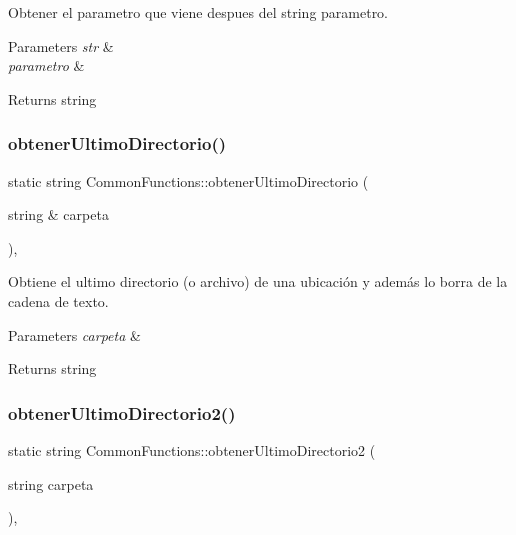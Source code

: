 Obtener el parametro que viene despues del string parametro. 


\begin{DoxyParams}{Parameters}
{\em str} & \\
\hline
{\em parametro} & \\
\hline
\end{DoxyParams}
\begin{DoxyReturn}{Returns}
string 
\end{DoxyReturn}
\mbox{\label{classCommonFunctions_a9b3747c4d4a2bc6d897ba1ae2ec59f00}} 
\subsubsection{\texorpdfstring{obtener\+Ultimo\+Directorio()}{obtenerUltimoDirectorio()}}
{\footnotesize\ttfamily static string Common\+Functions\+::obtener\+Ultimo\+Directorio (\begin{DoxyParamCaption}\item[{string \&}]{carpeta }\end{DoxyParamCaption})\hspace{0.3cm}{\ttfamily [inline]}, {\ttfamily [static]}}



Obtiene el ultimo directorio (o archivo) de una ubicación y además lo borra de la cadena de texto. 


\begin{DoxyParams}{Parameters}
{\em carpeta} & \\
\hline
\end{DoxyParams}
\begin{DoxyReturn}{Returns}
string 
\end{DoxyReturn}
\mbox{\label{classCommonFunctions_af27fbe7fc5de24747ddf5a0496016301}} 
\subsubsection{\texorpdfstring{obtener\+Ultimo\+Directorio2()}{obtenerUltimoDirectorio2()}}
{\footnotesize\ttfamily static string Common\+Functions\+::obtener\+Ultimo\+Directorio2 (\begin{DoxyParamCaption}\item[{string}]{carpeta }\end{DoxyParamCaption})\hspace{0.3cm}{\ttfamily [inline]}, {\ttfamily [static]}}



